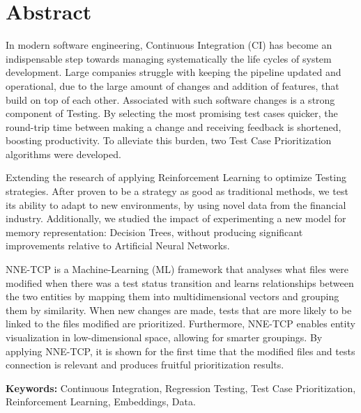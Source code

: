 
\section*{Abstract}


In modern software engineering, Continuous Integration (CI) has become an indispensable step towards managing systematically the life cycles of system development. Large companies struggle with keeping the pipeline updated and operational, due to the large amount of changes and addition of features, that build on top of each other. Associated with such software changes is a strong component of Testing. By selecting the most promising test cases quicker, the round-trip time between making a change and receiving feedback is shortened, boosting productivity. To alleviate this burden, two Test Case Prioritization algorithms were developed.

Extending the research of applying Reinforcement Learning to optimize Testing strategies. After proven to be a strategy as good as traditional methods, we test its ability to adapt to new environments, by using novel data from the financial industry.
Additionally, we studied the impact of experimenting a new model for memory representation: Decision Trees, without producing significant improvements relative to Artificial Neural Networks.
 
NNE-TCP is a Machine-Learning (ML) framework that analyses what files were modified when there was a test status transition and learns relationships between the two entities by mapping them into multidimensional vectors and grouping them by similarity. When new changes are made, tests that are more likely to be linked to the files modified are prioritized. Furthermore, NNE-TCP enables entity visualization in low-dimensional space, allowing for smarter groupings.
By applying NNE-TCP, it is shown for the first time that the modified files and tests connection is relevant and produces fruitful prioritization results.

\vfill

\textbf{\Large Keywords:} Continuous Integration, Regression Testing, Test Case Prioritization, Reinforcement Learning,  Embeddings, Data.

